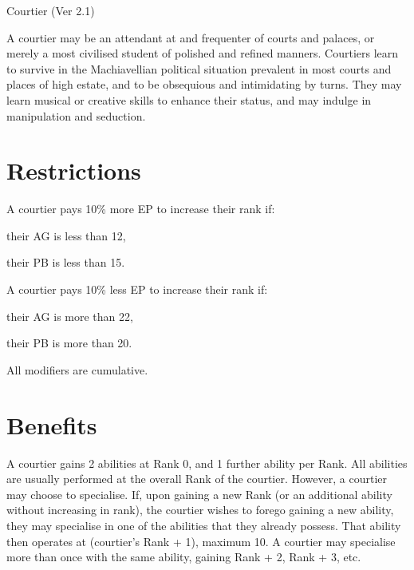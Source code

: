 \begin{Chapter}{Courtier (Ver 2.1)}

A courtier may be an attendant at and frequenter of courts and
palaces, or merely a most civilised student of polished and refined
manners. Courtiers learn to survive in the Machiavellian political
situation prevalent in most courts and places of high estate, and to
be obsequious and intimidating by turns. They may learn musical or
creative skills to enhance their status, and may indulge in
manipulation and seduction.

\section{Restrictions}

A courtier pays 10\% more EP to increase their rank if:

\begin{Itemize}
  
\item their AG is less than 12,  

\item their PB is less than 15. 

\end{Itemize}

A courtier pays 10\% less EP to increase their rank if:

\begin{Itemize}

\item their AG is more than 22,  

\item their PB is more than 20.

\end{Itemize}

All modifiers are cumulative.

\section{Benefits}

A courtier gains 2 abilities at Rank 0, and 1 further ability per
Rank. All abilities are usually performed at the overall Rank of the
courtier.  However, a courtier may choose to specialise. If, upon
gaining a new Rank (or an additional ability without increasing in
rank), the courtier wishes to forego gaining a new ability, they may
specialise in one of the abilities that they already possess.  That
ability then operates at (courtier’s Rank + 1), maximum 10. A courtier
may specialise more than once with the same ability, gaining Rank + 2,
Rank + 3, etc.


\end{Chapter}
